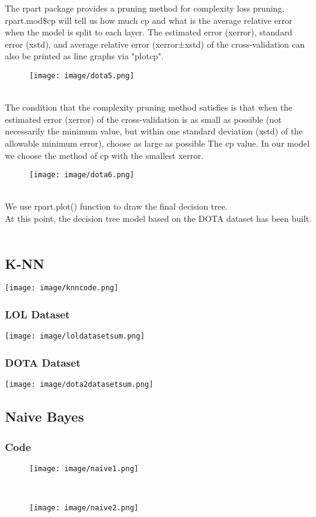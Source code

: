 \documentclass[a4paper,fleqn]{cas-sc}
\begin{document}
The rpart package provides a pruning method for complexity loss pruning. rpart.mod$\$ $cp will tell us how much cp and what is the average relative error when the model is split to each layer.  The estimated error (xerror), standard error (xstd), and average relative error (xerror±xstd) of the cross-validation can also be printed as line graphs via "plotcp".\\
\begin{figure}[h!]
	\centering
		\texttt{[image: image/dota5.png]}
	\caption{}
	\label{FIG:1}
\end{figure}\\
The condition that the complexity pruning method satisfies is that when the estimated error (xerror) of the cross-validation is as small as possible (not necessarily the minimum value, but within one standard deviation (xstd) of the allowable minimum error), choose as large as possible The cp value. In our model we  choose the method of cp with the smallest xerror.\\
\begin{figure}[h!]
	\centering
		\texttt{[image: image/dota6.png]}
	\caption{}
	\label{FIG:1}
\end{figure}\\
We use rpart.plot() function to draw the final decision tree.\\
At this point, the decision tree model based on the DOTA dataset has been built.\\\\
\subsection{K-NN}
\texttt{[image: image/knncode.png]}
 \\
\subsubsection{LOL Dataset}
\texttt{[image: image/loldatasetsum.png]}
 \\
\subsubsection{DOTA Dataset}
\texttt{[image: image/dota2datasetsum.png]}
 \\
\subsection{Naive Bayes}
\subsubsection{Code} 
 \begin{figure}[h!]
	\centering
		\texttt{[image: image/naive1.png]}
	\caption{}
	\label{FIG:1}
\end{figure}\\
\begin{figure}[h!]
	\centering
		\texttt{[image: image/naive2.png]}
	\caption{}
	\label{FIG:1}
\end{figure}\\
 \\
\end{document}
